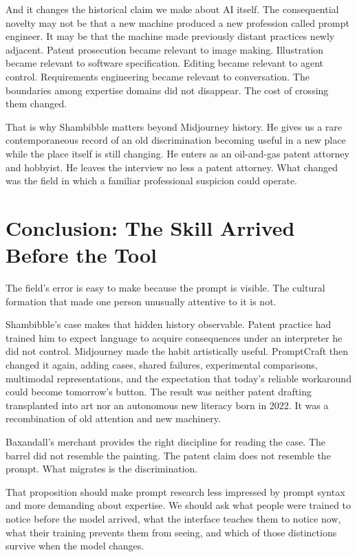 \documentclass[11pt]{article}
\begin{document}
And it changes the historical claim we make about AI itself. The consequential novelty may not be that a new machine produced a new profession called prompt engineer. It may be that the machine made previously distant practices newly adjacent. Patent prosecution became relevant to image making. Illustration became relevant to software specification. Editing became relevant to agent control. Requirements engineering became relevant to conversation. The boundaries among expertise domains did not disappear. The cost of crossing them changed.

That is why Shambibble matters beyond Midjourney history. He gives us a rare contemporaneous record of an old discrimination becoming useful in a new place while the place itself is still changing. He enters as an oil-and-gas patent attorney and hobbyist. He leaves the interview no less a patent attorney. What changed was the field in which a familiar professional suspicion could operate.

\section{Conclusion: The Skill Arrived Before the Tool}

The field's error is easy to make because the prompt is visible. The cultural formation that made one person unusually attentive to it is not.

Shambibble's case makes that hidden history observable. Patent practice had trained him to expect language to acquire consequences under an interpreter he did not control. Midjourney made the habit artistically useful. PromptCraft then changed it again, adding cases, shared failures, experimental comparisons, multimodal representations, and the expectation that today's reliable workaround could become tomorrow's button. The result was neither patent drafting transplanted into art nor an autonomous new literacy born in 2022. It was a recombination of old attention and new machinery.

Baxandall's merchant provides the right discipline for reading the case. The barrel did not resemble the painting. The patent claim does not resemble the prompt. What migrates is the discrimination.

That proposition should make prompt research less impressed by prompt syntax and more demanding about expertise. We should ask what people were trained to notice before the model arrived, what the interface teaches them to notice now, what their training prevents them from seeing, and which of those distinctions survive when the model changes.
\end{document}
